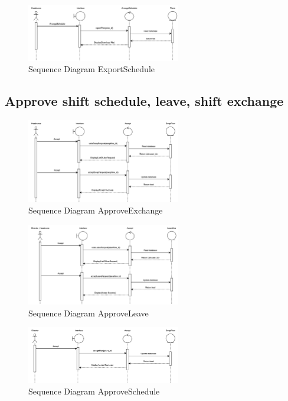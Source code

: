     \begin{figure}[h]
    \centering
    \includegraphics[width=0.6\textwidth]{Sequence 3.4.png}
    \caption{Sequence Diagram ExportSchedule}
    \end{figure}


\subsection{Approve shift schedule, leave, shift exchange}

    \begin{figure}[h]
    \centering
    \includegraphics[width=0.6\textwidth]{Sequence 4.1.png}
    \caption{Sequence Diagram ApproveExchange}
    \end{figure}

    \begin{figure}[h]
    \centering
    \includegraphics[width=0.6\textwidth]{Sequence 4.2.png}
    \caption{Sequence Diagram ApproveLeave}
    \end{figure}

    \begin{figure}[h]
    \centering
    \includegraphics[width=0.6\textwidth]{Sequence 4.3.png}
    \caption{Sequence Diagram ApproveSchedule}
    \end{figure}

